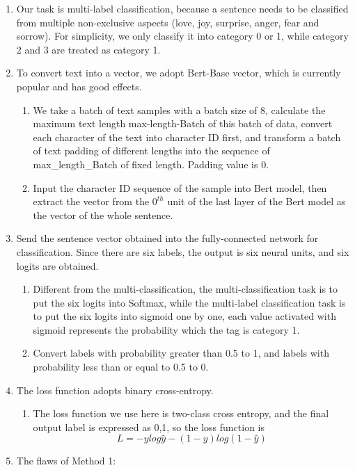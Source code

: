 \documentclass[12pt,twocolumn,letterpaper]{article}
\begin{document}
\begin{enumerate}
\begin{enumerate}
\item Our task is multi-label classification, because a sentence needs to be classified from multiple non-exclusive aspects (love, joy, surprise, anger, fear and sorrow). For simplicity, we only classify it into category 0 or 1, while category 2 and 3 are treated as category 1.  
\item To convert text into a vector, we adopt Bert-Base vector, which is currently popular and has good effects.  
\begin{enumerate}
\item We take a batch of text samples with a batch size of 8, calculate the maximum text length max-length-Batch of this batch of data, convert each character of the text into character ID first, and transform a batch of text padding of different lengths into the sequence of max\_length\_Batch of fixed length. Padding value is 0.  
\item Input the character ID sequence of the sample into Bert model, then extract the vector from the $0^{th}$ unit of the last layer of the Bert model as the vector of the whole sentence.  
\end{enumerate}
\item Send the sentence vector obtained into the fully-connected network for classification. Since there are six labels, the output is six neural units, and six logits are obtained.  
\begin{enumerate}
\item Different from the multi-classification, the multi-classification task is to put the six logits into Softmax, while the multi-label classification task is to put the six logits into sigmoid one by one, each value activated with sigmoid represents the probability which the tag is category 1.  
\item Convert labels with probability greater than 0.5 to 1, and labels with probability less than or equal to 0.5 to 0. 
\end{enumerate}
\item The loss function adopts binary cross-entropy.  
\begin{enumerate}
\item The loss function we use here is two-class cross entropy, and the final output label is expressed as {0,1}, so the loss function is
$$L=-ylog\hat{y}-(1-y)log(1-\hat{y})$$
\end{enumerate}
\item The flaws of Method 1:
\begin{enumerate}


\end{enumerate}
\end{enumerate}
\end{enumerate}
\end{document}
